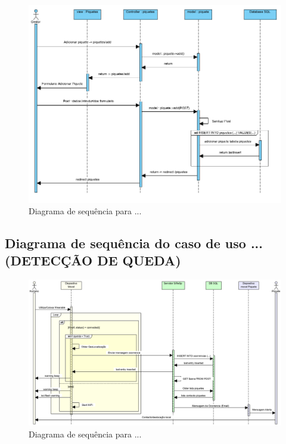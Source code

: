 \begin{figure}[!htb]
	\centering
	\includegraphics[width=\textwidth]{figuras/sequence_diagram_gestor.png}
	\caption{Diagrama de sequência para ...}
	\label{fig:sequência_gestor}
\end{figure}

\subsection{Diagrama de sequência do caso de uso ...(DETECÇÃO DE QUEDA)}



\begin{figure}[!htb]
	\centering
	\includegraphics[width=\textwidth]{figuras/sequence_diagram_system_2.png}
	\caption{Diagrama de sequência para ...}
	\label{fig:sequência_sistema}
\end{figure}

